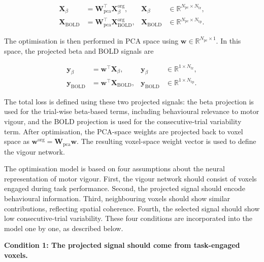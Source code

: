\documentclass[utf8]{frontiers_suppmat}
\begin{document}
\begin{equation*}
\begin{aligned}
\mathbf{X}_{\beta}
&=
\mathbf{W}_{\mathrm{pca}}^\top
\mathbf{X}_{\beta}^{\mathrm{org}},
&
\mathbf{X}_{\beta}
&\in \mathbb{R}^{N_{\mathrm{pc}} \times N_{\mathrm{tr}}},
\\[2pt]
\mathbf{X}_{\mathrm{BOLD}}
&=
\mathbf{W}_{\mathrm{pca}}^\top
\mathbf{X}_{\mathrm{BOLD}}^{\mathrm{org}},
&
\mathbf{X}_{\mathrm{BOLD}}
&\in \mathbb{R}^{N_{\mathrm{pc}} \times N_{\mathrm{tp}}}.
\end{aligned}
\label{eq:pca_inputs}
\end{equation*}

The optimisation is then performed in PCA space using
\(\mathbf{w} \in \mathbb{R}^{N_{\mathrm{pc}} \times 1}\). In this space, the projected
beta and BOLD signals are

\begin{equation*}
\begin{aligned}
\mathbf{y}_{\beta}
&=
\mathbf{w}^{\top}
\mathbf{X}_{\beta},
&
\mathbf{y}_{\beta}
&\in \mathbb{R}^{1 \times N_{\mathrm{tr}}},
\\[2pt]
\mathbf{y}_{\mathrm{BOLD}}
&=
\mathbf{w}^{\top}
\mathbf{X}_{\mathrm{BOLD}},
&
\mathbf{y}_{\mathrm{BOLD}}
&\in \mathbb{R}^{1 \times N_{\mathrm{tp}}}.
\end{aligned}
\label{eq:y_beta_bold}
\end{equation*}

The total loss is defined using these two projected signals: the beta projection is used
for the trial-wise beta-based terms, including behavioural relevance to motor vigour, and
the BOLD projection is used for the consecutive-trial variability term. After
optimisation, the PCA-space weights are projected back to voxel space as $\mathbf{w}^{\mathrm{org}} = \mathbf{W}_{\mathrm{pca}} \mathbf{w}$. The resulting voxel-space weight vector is used to define the vigour network.

The optimisation model is based on four assumptions about the neural representation of motor vigour. First, the vigour network should consist of voxels engaged during task performance. Second, the projected signal should encode behavioural information. Third, neighbouring voxels should show similar contributions, reflecting spatial coherence. Fourth, the selected signal should show low consecutive-trial variability. These four conditions are incorporated into the model one by one, as described below.

\textbf{Condition 1: The projected signal should come from task-engaged voxels.}
\end{document}
